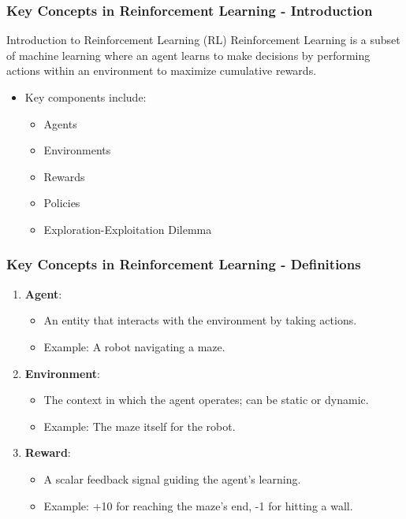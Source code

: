 \documentclass{beamer}
\begin{document}
\begin{frame}[fragile]
    \frametitle{Key Concepts in Reinforcement Learning - Introduction}
    \begin{block}{Introduction to Reinforcement Learning (RL)}
        Reinforcement Learning is a subset of machine learning where an agent learns to make decisions by performing actions within an environment to maximize cumulative rewards. 
    \end{block}
    
    \begin{itemize}
        \item Key components include:
        \begin{itemize}
            \item Agents
            \item Environments
            \item Rewards
            \item Policies
            \item Exploration-Exploitation Dilemma
        \end{itemize}
    \end{itemize}
\end{frame}

\begin{frame}[fragile]
    \frametitle{Key Concepts in Reinforcement Learning - Definitions}
    \begin{enumerate}
        \item \textbf{Agent}:
        \begin{itemize}
            \item An entity that interacts with the environment by taking actions.
            \item Example: A robot navigating a maze.
        \end{itemize}

        \item \textbf{Environment}:
        \begin{itemize}
            \item The context in which the agent operates; can be static or dynamic.
            \item Example: The maze itself for the robot.
        \end{itemize}

        \item \textbf{Reward}:
        \begin{itemize}
            \item A scalar feedback signal guiding the agent's learning.
            \item Example: +10 for reaching the maze's end, -1 for hitting a wall.
        \end{itemize}
    \end{enumerate}
\end{frame}
\end{document}
